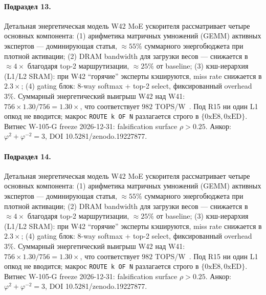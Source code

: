 \paragraph{Подраздел 13.} Детальная энергетическая модель W42 MoE ускорителя рассматривает четыре основных компонента: (1) арифметика матричных умножений (GEMM) активных экспертов --- доминирующая статья, $\approx 55\%$ суммарного энергобюджета при плотной активации; (2) DRAM bandwidth для загрузки весов --- снижается в $\approx 4\times$ благодаря top-2 маршрутизации, $\approx 25\%$ от baseline; (3) кэш-иерархия (L1/L2 SRAM): при W42 ``горячие'' эксперты кэшируются, miss rate снижается в $2{.}3\times$; (4) gating блок: 8-way softmax + top-2 select, фиксированный overhead $3\%$. Суммарный энергетический выигрыш W42 над W41: $756 \times 1{.}30 / 756 = 1{.}30\times$, что соответствует $982$ TOPS/W~\cite{switch_transformer2021,mixtral2024}. Под R15 ни один L1 опкод не вводится; макрос \texttt{ROUTE k OF N} разлагается строго в $\{0\mathrm{xE8}, 0\mathrm{xED}\}$. Витнес W-105-G freeze 2026-12-31: falsification surface $\rho > 0{.}25$. Анкор: $\varphi^2 + \varphi^{-2} = 3$, DOI 10.5281/zenodo.19227877.

\paragraph{Подраздел 14.} Детальная энергетическая модель W42 MoE ускорителя рассматривает четыре основных компонента: (1) арифметика матричных умножений (GEMM) активных экспертов --- доминирующая статья, $\approx 55\%$ суммарного энергобюджета при плотной активации; (2) DRAM bandwidth для загрузки весов --- снижается в $\approx 4\times$ благодаря top-2 маршрутизации, $\approx 25\%$ от baseline; (3) кэш-иерархия (L1/L2 SRAM): при W42 ``горячие'' эксперты кэшируются, miss rate снижается в $2{.}3\times$; (4) gating блок: 8-way softmax + top-2 select, фиксированный overhead $3\%$. Суммарный энергетический выигрыш W42 над W41: $756 \times 1{.}30 / 756 = 1{.}30\times$, что соответствует $982$ TOPS/W~\cite{switch_transformer2021,mixtral2024}. Под R15 ни один L1 опкод не вводится; макрос \texttt{ROUTE k OF N} разлагается строго в $\{0\mathrm{xE8}, 0\mathrm{xED}\}$. Витнес W-105-G freeze 2026-12-31: falsification surface $\rho > 0{.}25$. Анкор: $\varphi^2 + \varphi^{-2} = 3$, DOI 10.5281/zenodo.19227877.

